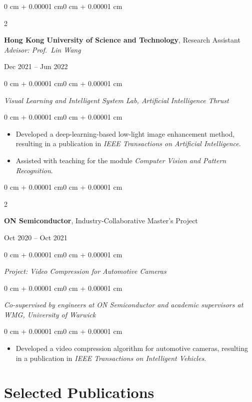 \documentclass[10pt, letterpaper]{article}
\newenvironment{highlights}{
    \begin{itemize}[
        topsep=0.10 cm,
        parsep=0.10 cm,
        partopsep=0pt,
        itemsep=0pt,
        leftmargin=0 cm + 10pt
    ]
}{
    \end{itemize}
}
\newenvironment{onecolentry}{
    \begin{adjustwidth}{0 cm + 0.00001 cm}{0 cm + 0.00001 cm}
}{
    \end{adjustwidth}
}
\newenvironment{twocolentry}[2][]{
    \onecolentry
    \def\secondColumn{#2}
    \setcolumnwidth{\fill, 6.5 cm}
    \begin{paracol}{2}
}{
    \switchcolumn \raggedleft \secondColumn
    \end{paracol}
    \endonecolentry
}
\begin{document}
\vspace{0.12cm}

\begin{twocolentry}{Dec 2021 -- Jun 2022}
    \textbf{Hong Kong University of Science and Technology}, Research Assistant \textit{Advisor: Prof.\ Lin Wang}
\end{twocolentry}

\begin{onecolentry}
    \textit{Visual Learning and Intelligent System Lab, Artificial Intelligence Thrust}
\end{onecolentry}
\begin{onecolentry}
    \begin{highlights}
        \item Developed a deep-learning-based low-light image enhancement method, resulting in a publication in \textit{IEEE Transactions on Artificial Intelligence}.
        \item Assisted with teaching for the module \textit{Computer Vision and Pattern Recognition}.
    \end{highlights}
\end{onecolentry}

\vspace{0.12cm}

\begin{twocolentry}{Oct 2020 -- Oct 2021}
    \textbf{ON Semiconductor}, Industry-Collaborative Master's Project
\end{twocolentry}
\begin{onecolentry}
    \textit{Project: Video Compression for Automotive Cameras}
\end{onecolentry}
\begin{onecolentry}
    \textit{Co-supervised by engineers at ON Semiconductor and academic supervisors at WMG, University of Warwick}
\end{onecolentry}
\begin{onecolentry}
    \begin{highlights}
        \item Developed a video compression algorithm for automotive cameras, resulting in a publication in \textit{IEEE Transactions on Intelligent Vehicles}.
    \end{highlights}
\end{onecolentry}

\section{Selected Publications}
\end{document}
